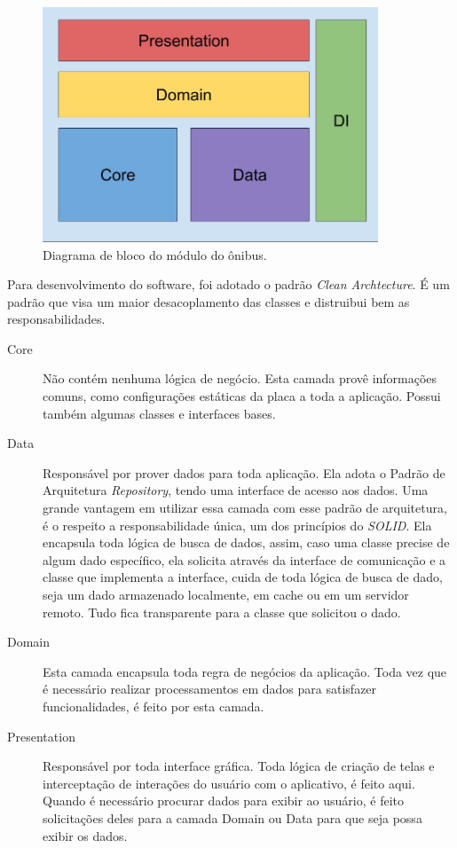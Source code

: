\documentclass[
	12pt,				%
	oneside,			%
	a4paper,			%
	brazil				%
]{abntex2}
\begin{document}
\begin{figure}[!h]
\centering
\includegraphics[width=10cm, center]{images/brick_diagram_bus_tracker}
\caption{Diagrama de bloco do módulo do ônibus.}
\label{Rotulo}
\end{figure}

Para desenvolvimento do software, foi adotado o padrão \textit{Clean Archtecture}. É um padrão que visa um maior desacoplamento das classes e distruibui bem as responsabilidades.

\begin{description}

\item[Core] Não contém nenhuma lógica de negócio. Esta camada provê informações comuns, como configurações estáticas da placa a toda a aplicação. Possui também algumas classes e interfaces bases.

\item[Data] Responsável por prover dados para toda aplicação. Ela adota o Padrão de Arquitetura \textit{Repository}, tendo uma interface de acesso aos dados. Uma grande vantagem em utilizar essa camada com esse padrão de arquitetura, é o respeito a responsabilidade única, um dos princípios do \textit{SOLID}. Ela encapsula toda lógica de busca de dados, assim, caso uma classe precise de algum dado específico, ela solicita através da interface de comunicação e a classe que implementa a interface, cuida de toda lógica de busca de dado, seja um dado armazenado localmente, em cache ou em um servidor remoto. Tudo fica transparente para a classe que solicitou o dado.

\item[Domain] Esta camada encapsula toda regra de negócios da aplicação. Toda vez que é necessário realizar processamentos em dados para satisfazer funcionalidades, é feito por esta camada.

\item[Presentation] Responsável por toda interface gráfica. Toda lógica de criação de telas e interceptação de interações do usuário com o aplicativo, é feito aqui. Quando é necessário procurar dados para exibir ao usuário, é feito solicitações deles para a camada Domain ou Data para que seja possa exibir os dados.
 
\end{description}
\end{document}
